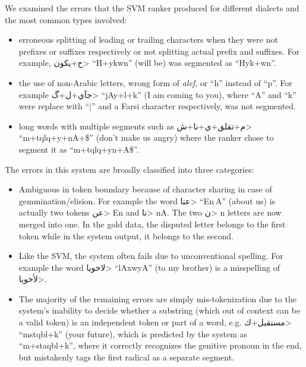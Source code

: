 \documentclass[11pt,letterpaper]{article}
\begin{document}
  We examined the errors that the SVM ranker produced for different dialects and the most common types involved:
\begin{itemize}[leftmargin=*]
\setlength\itemsep{-0.3em}
\item erroneous splitting of leading or trailing characters when they were not prefixes or suffixes respectively or not splitting actual prefix and suffixes. For example, \<ح+يكون> ``H+ykwn'' (will be) was segmented as ``Hyk+wn''. \item the use of non-Arabic letters, wrong form of \textit{alef}, or ``h'' instead of ``p''.  For example \<جآي+ل+گ> ``jAy+l+k'' (I am coming to you), where ``A'' and ``k'' were replace with ``$|$'' and a Farsi character respectively, was not segmented.
\item long words with multiple segments such as \<م+تقلق+ي+نا+ش> ``m+tqlq+y+nA+\$'' (don't make us angry) where the ranker chose to segment it as ``m+tqlq+yn+A\$''.
\end{itemize}


 The errors in this system are broadly classified into three categories:
\begin{itemize}[leftmargin=*]
\setlength\itemsep{-0.3em}
\item Ambiguous in token boundary because of character sharing in case of gemmination/elision. For example the word \<عنا> ``En$~$A'' (about us) is actually two tokens \<عن> En and \<نا> nA. The two \<ن> n letters are now merged into one. In the gold data, the disputed letter belongs to the first token while in the system output, it belongs to the second.
\item Like the SVM, the system often fails due to unconventional spelling. For example the word \<لاخويا> ``lAxwyA'' (to my brother) is a misspelling of \<لأخويا>. \item The majority of the remaining errors are simply mis-tokenization due to the system's inability to decide whether a substring (which out of context can be a valid token) is an independent token or part of a word, e.g. \<مستقبل+ك> ``mstqbl+k'' (your future), which is predicted by the system as ``m+staqbl+k'', where it correctly recognizes the genitive pronoun in the end, but mistakenly tags the first radical as a separate segment. \end{itemize}
\end{document}
